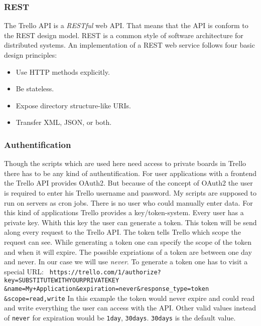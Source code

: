 \subsubsection{REST}
The Trello API is a \emph{RESTful} web API. That means that the API is conform to the REST design model. REST is a common style of software architecture for distributed systems. An implementation of a REST web service follows four basic design principles:
\begin{itemize}
	\item Use HTTP methods explicitly.
	\item Be stateless.
	\item Expose directory structure-like URIs.
	\item Transfer XML, JSON, or both.
\end{itemize}

\cite{rest}

\subsubsection{Authentification}
Though the scripts which are used here need access to private boards in Trello there has to be any kind of authentification. For user applications with a frontend the Trello API provides OAuth2. But because of the concept of OAuth2 the user is required to enter his Trello username and password. \cite{oauth} My scripts are supposed to run on servers as cron jobs. There is no user who could manually enter data. For this kind of applications Trello provides a key/token-system. Every user has a private key. Whith this key the user can generate a token. This token will be send along every request to the Trello API. The token tells Trello which scope the request can see. While generating a token one can specify the scope of the token and when it will expire. The possible expriations of a token are between one day and never. In our case we will use \emph{never}. To generate a token one has to visit a special URL:
\texttt{
https://trello.com/1/authorize?key=SUBSTITUTEWITHYOURPRIVATEKEY \&name=My+Application\&expiration=never\&response\_type=token \&scope=read,write}
In this example the token would never expire and could read and write everything the user can access with the API. Other valid values instead of \texttt{never} for expiration would be \texttt{1day}, \texttt{30days}. \texttt{30days} is the default value. \cite{trello:gettingstarted}

